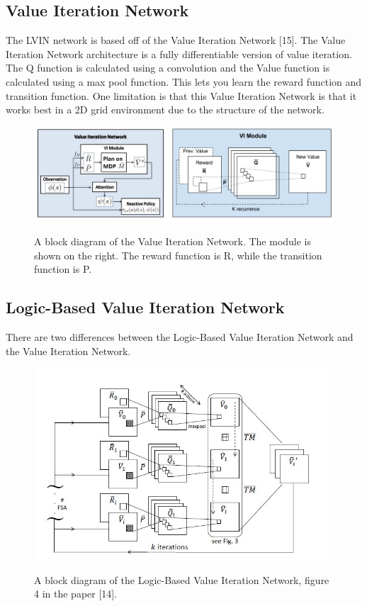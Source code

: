 \documentclass[letterpaper, 10 pt, conference]{ieeeconf}  %
\begin{document}
\subsection{Value Iteration Network} 
The LVIN network is based off of the Value Iteration Network [15]. The Value Iteration Network architecture is a fully differentiable version of value iteration. The Q function is calculated using a convolution and the Value function is calculated using a max pool function. This lets you learn the reward function and transition function. One limitation is that this Value Iteration Network is that it works best in a 2D grid environment due to the structure of the network.
\begin{figure}[h]
 \centering
 \includegraphics[scale=.33]{ValueIterationNetwork.JPG}\\
 \caption{A block diagram of the Value Iteration Network. The module is shown on the right. The reward function is R, while the transition function is P.}
\end{figure}
\newpage
\subsection{Logic-Based Value Iteration Network}
There are two differences between the Logic-Based Value Iteration Network and the Value Iteration Network. 
\begin{figure}[h]
 \centering
 \includegraphics[scale=.5]{LVIN.JPG}\\
 \caption{A block diagram of the Logic-Based Value Iteration Network, figure 4 in the paper [14].}
\end{figure}
\end{document}
